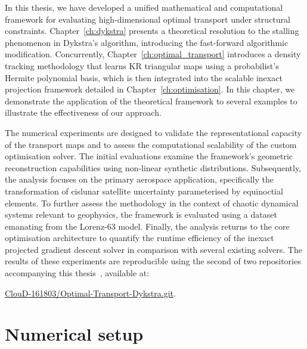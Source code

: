 In this thesis, we have developed a unified mathematical and computational framework for evaluating high-dimensional optimal transport under structural constraints. Chapter~\ref{ch:dykstra} presents a theoretical resolution to the stalling phenomenon in Dykstra's algorithm, introducing the fast-forward algorithmic modification. Concurrently, Chapter~\ref{ch:optimal_transport} introduces a density tracking methodology that learns KR triangular maps using a probabilist's Hermite polynomial basis, which is then integrated into the scalable inexact projection framework detailed in Chapter~\ref{ch:optimisation}. In this chapter, we demonstrate the application of the theoretical framework to several examples to illustrate the effectiveness of our approach.

The numerical experiments are designed to validate the representational capacity of the transport maps and to assess the computational scalability of the custom optimisation solver. The initial evaluations examine the framework's geometric reconstruction capabilities using non-linear synthetic distributions. Subsequently, the analysis focuses on the primary aerospace application, specifically the transformation of cislunar satellite uncertainty parameterised by equinoctial elements. To further assess the methodology in the context of chaotic dynamical systems relevant to geophysics, the framework is evaluated using a dataset emanating from the Lorenz-63 model. Finally, the analysis returns to the core optimisation architecture to quantify the runtime efficiency of the inexact projected gradient descent solver in comparison with several existing solvers. The results of these experiments are reproducible using the second of two repositories accompanying this thesis~\cite{DykstraProjectRepo, DykstraOptimalTransportRepo}, available at:

\begin{center}
    \href{https://github.com/ClouD-161803/Optimal-Transport-Dykstra}{ClouD-161803/Optimal-Transport-Dykstra.git}.
\end{center}

\section*{Numerical setup}

